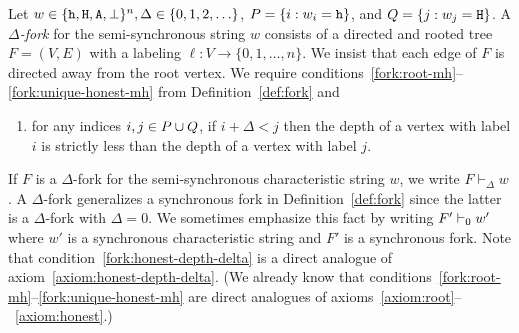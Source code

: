   \begin{definition}\label{def:delta-fork}
    Let $w\in \{\mathtt{h}, \mathtt{H}, \mathtt{A}, \perp\}^n, \Delta \in \{0, 1, 2, \ldots \}$, 
    $P = \{ i : w_i = \mathtt{h}\}$, and $Q = \{ j : w_j = \mathtt{H}\}$. 
    A \emph{$\Delta$-fork} for the semi-synchronous string $w$ consists of a directed and rooted
    tree $F=(V,E)$ with a labeling $\ell:V \to \{0,1,\ldots,n\}$. We insist
    that each edge of $F$ is directed away from the root vertex. 
    We require conditions~\ref{fork:root-mh}--\ref{fork:unique-honest-mh} 
    from Definition~\ref{def:fork} and 
    \begin{enumerate}[label=(F{\arabic*}\textsubscript{$\Delta$}), start=4]



      \item\label{fork:honest-depth-delta} 
      for any indices $i,j\in P \cup Q$, 
      if $i + \Delta < j$ then 
      the depth of a vertex with label $i$ 
      is strictly less than 
      the depth of a vertex with label $j$.
    \end{enumerate}
  \end{definition}
  If $F$ is a $\Delta$-fork for the semi-synchronous characteristic string $w$, we write
  $F\vdash_\Delta w$.  
  A $\Delta$-fork generalizes a synchronous fork in Definition~\ref{def:fork} 
  since the latter is a $\Delta$-fork with $\Delta = 0$. 
  We sometimes emphasize this fact by writing $F' \vdash_0 w'$ 
  where $w'$ is a synchronous characteristic string and $F'$ is a synchronous fork.
  Note that 
  condition~\ref{fork:honest-depth-delta} 
  is a direct analogue of axiom~\ref{axiom:honest-depth-delta}.
  (We already know that conditions~\ref{fork:root-mh}--\ref{fork:unique-honest-mh} 
  are direct
  analogues of axioms~\ref{axiom:root}--~\ref{axiom:honest}.) 


